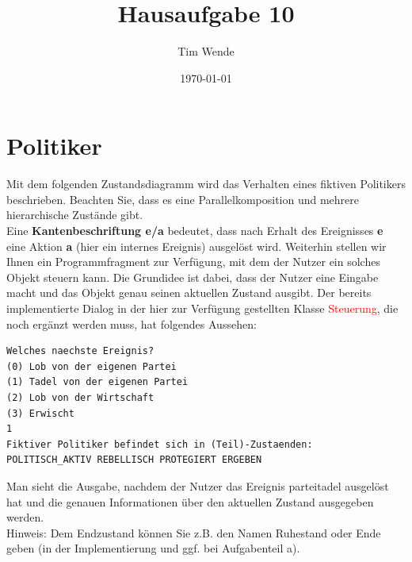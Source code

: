 \documentclass{article}
\author{Tim Wende}
\date{\today}
\title{\textbf{Hausaufgabe 10}}
\newcommand{\gqq}[1]{\glqq{}#1\grqq{}}
\begin{document}
    \maketitle

    \section*{Politiker}

    Mit dem folgenden Zustandsdiagramm wird das Verhalten eines fiktiven Politikers beschrieben.
    Beachten Sie, dass es eine Parallelkomposition und mehrere hierarchische Zustände gibt.\\

    Eine \textbf{Kantenbeschriftung e/a} bedeutet, dass nach Erhalt des Ereignisses \textbf{e} eine Aktion \textbf{a} (hier ein internes Ereignis) ausgelöst wird.
    Weiterhin stellen wir Ihnen ein Programmfragment zur Verfügung, mit dem der Nutzer ein solches Objekt steuern kann.
    Die Grundidee ist dabei, dass der Nutzer eine Eingabe macht und das Objekt genau seinen aktuellen Zustand ausgibt.
    Der bereits implementierte Dialog in der hier zur Verfügung gestellten Klasse \textcolor{red}{Steuerung}, die noch ergänzt werden muss, hat folgendes Aussehen:

    \begin{lstlisting}
Welches naechste Ereignis?
(0) Lob von der eigenen Partei
(1) Tadel von der eigenen Partei
(2) Lob von der Wirtschaft
(3) Erwischt
1
Fiktiver Politiker befindet sich in (Teil)-Zustaenden:
POLITISCH_AKTIV REBELLISCH PROTEGIERT ERGEBEN
    \end{lstlisting}

    Man sieht die Ausgabe, nachdem der Nutzer das Ereignis \gqq{parteitadel} ausgelöst hat und die genauen Informationen über den aktuellen Zustand ausgegeben werden.\\

    Hinweis: Dem Endzustand können Sie z.B. den Namen Ruhestand oder Ende geben (in der Implementierung und ggf. bei Aufgabenteil a).
\end{document}
